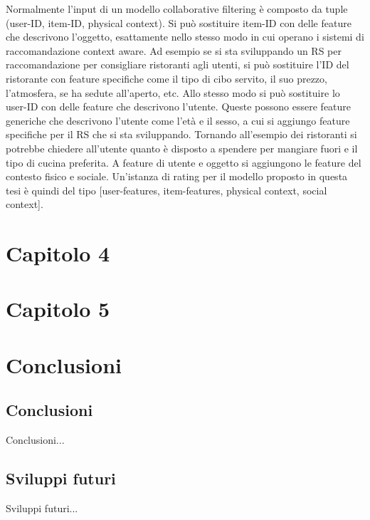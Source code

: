 \documentclass[12pt,italian]{report}
\begin{document}
Normalmente l'input di un modello collaborative filtering è composto da tuple (user-ID, item-ID, physical context). Si può sostituire item-ID con delle feature che descrivono l'oggetto, esattamente nello stesso modo in cui operano i sistemi di raccomandazione context aware. Ad esempio se si sta sviluppando un RS per raccomandazione per consigliare ristoranti agli utenti, si può sostituire l'ID del ristorante con feature specifiche come il tipo di cibo servito, il suo prezzo, l'atmosfera, se ha sedute all'aperto, etc. Allo stesso modo si può sostituire lo user-ID con delle feature che descrivono l'utente. Queste possono essere feature generiche che descrivono l'utente come l'età e il sesso, a cui si aggiungo feature specifiche per il RS che si sta sviluppando. Tornando all'esempio dei ristoranti si potrebbe chiedere all'utente quanto è disposto a spendere per mangiare fuori e il tipo di cucina preferita. A feature di utente e oggetto si aggiungono le feature del contesto fisico e sociale. Un'istanza di rating per il modello proposto in questa tesi è quindi del tipo [user-features, item-features, physical context, social context].


% 
% 

\chapter{Capitolo 4}
\label{chap:datasets}


% 
% 

\chapter{Capitolo 5}
\label{chap:risultati}


% 
% 

\chapter{Conclusioni}
\label{cap6}

\section{Conclusioni}

Conclusioni...

\section{Sviluppi futuri}

Sviluppi futuri...



%
%



\end{document}
